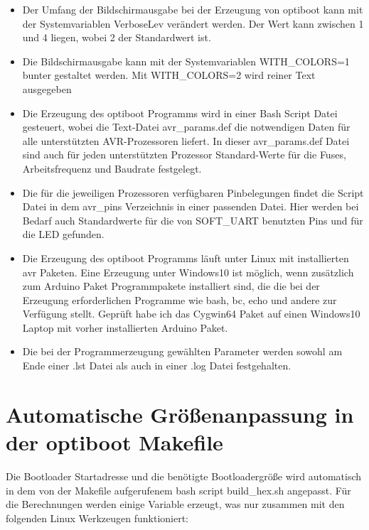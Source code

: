 \begin{itemize}

\item {Der Umfang der Bildschirmausgabe bei der Erzeugung von optiboot kann mit der Systemvariablen
	VerboseLev verändert werden. Der Wert kann zwischen 1 und 4 liegen, wobei 2 der Standardwert ist.}

\item {Die Bildschirmausgabe kann mit der Systemvariablen WITH\_COLORS=1 bunter gestaltet werden.
	Mit WITH\_COLORS=2 wird reiner Text ausgegeben}

\item {Die Erzeugung des optiboot Programms wird in einer Bash Script Datei gesteuert, wobei die
	Text-Datei avr\_params.def die notwendigen Daten für alle unterstützten AVR-Prozessoren liefert.
	In dieser avr\_params.def Datei sind auch für jeden unterstützten Prozessor Standard-Werte
	für die Fuses, Arbeitsfrequenz und Baudrate festgelegt.}

\item {Die für die jeweiligen Prozessoren verfügbaren Pinbelegungen findet die Script Datei 
	in dem avr\_pins Verzeichnis in einer passenden Datei. Hier werden bei Bedarf auch
	Standardwerte für die von SOFT\_UART benutzten Pins und für die LED gefunden.}

\item {Die Erzeugung des optiboot Programms läuft unter Linux mit installierten avr Paketen.
	Eine Erzeugung unter Windows10 ist möglich,
	wenn zusätzlich zum Arduino Paket Programmpakete installiert sind,
	die die bei der Erzeugung erforderlichen Programme wie bash, bc, echo und andere zur Verfügung stellt.
	Geprüft habe ich das Cygwin64 Paket auf einen Windows10 Laptop mit vorher installierten Arduino Paket.}

\item {Die bei der Programmerzeugung gewählten Parameter werden sowohl am Ende einer .lst Datei
	als auch in einer .log Datei festgehalten.}

\end{itemize}

\section{Automatische Größenanpassung in der optiboot Makefile}

Die Bootloader Startadresse und die benötigte Bootloadergröße wird
automatisch in dem von der Makefile aufgerufenem bash script build\_hex.sh angepasst.
Für die Berechnungen werden einige Variable erzeugt, was nur zusammen
mit den folgenden Linux Werkzeugen funktioniert:

